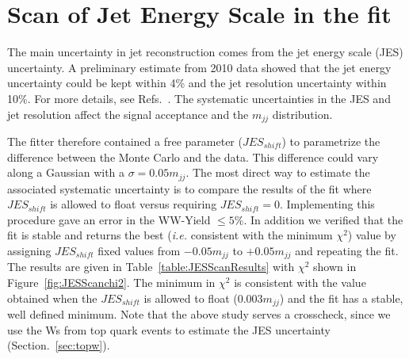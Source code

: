 \section{Scan of Jet Energy Scale in the fit}
The main uncertainty in jet reconstruction comes from the jet energy
scale (JES) uncertainty.  A
preliminary estimate from 2010 data showed that the jet energy
uncertainty could be kept within 4\% and the jet resolution
uncertainty within 10\%.  For more details, see
Refs.~\cite{jetsyst,jetsyst2}.  The systematic uncertainties in the
JES and jet resolution affect the signal acceptance and
the $m_{jj}$ distribution.

The fitter therefore contained a free parameter ($JES_{shift}$) to
parametrize the difference between the Monte Carlo and the data. This
difference could vary along a Gaussian with a $\sigma=0.05m_{jj}$. The
most direct way to estimate the associated systematic uncertainty is
to compare the results of the fit where $JES_{shift}$ is allowed to
float versus requiring $JES_{shift}=0$. Implementing this procedure
gave an error in the WW-Yield $\leq 5\% $. In addition we verified that
the fit is stable and returns the best ({\it i.e.} consistent with the
minimum $\chi^2$) value by assigning $JES_{shift}$ fixed values from
$-0.05m_{jj}$ to $+0.05m_{jj}$ and repeating the fit. The results are
given in Table~\ref{table:JESScanResults} with $\chi^2$ shown in
Figure~\ref{fig:JESScanchi2}. The minimum in $\chi^2$ is consistent
with the value obtained when the $JES_{shift}$ is allowed to float
($0.003m_{jj}$) and the fit has a stable, well defined minimum. Note
that the above study serves a crosscheck, since we use the Ws from top
quark events to estimate the JES uncertainty (Section.~\ref{sec:topw}).

